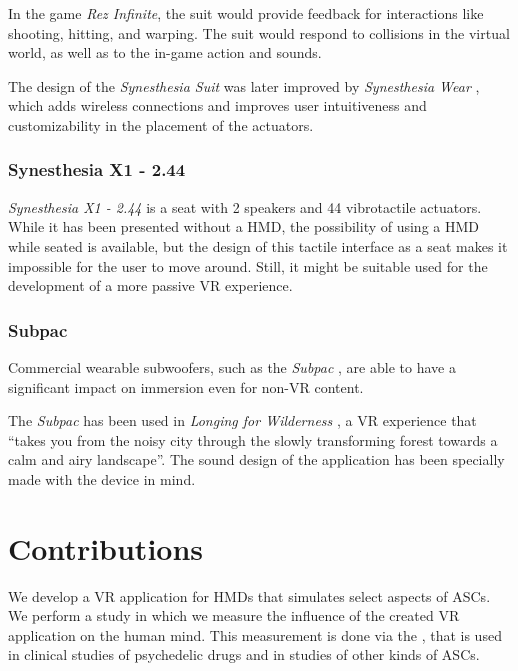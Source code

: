 In the game \textit{Rez Infinite}, the suit would provide feedback for interactions like shooting, hitting, and warping. The suit would respond to collisions in the virtual world, as well as to the in-game action and sounds.

The design of the \textit{Synesthesia Suit} was later improved by \textit{Synesthesia Wear} \autocite{furukawa2019synesthesia}, which adds wireless connections and improves user intuitiveness and customizability in the placement of the actuators.

\subsubsection{Synesthesia X1 - 2.44}
\textit{Synesthesia X1 - 2.44} \autocite{synesthesia2021x1} is a seat with 2 speakers and 44 vibrotactile actuators. While it has been presented without a \ac{HMD}, the possibility of using a \ac{HMD} while seated is available, but the design of this tactile interface as a seat makes it impossible for the user to move around. Still, it might be suitable used for the development of a more passive \ac{VR} experience.

\subsubsection{Subpac}
Commercial wearable subwoofers, such as the \textit{Subpac} \autocite{subpac2013subpac}, are able to have a significant impact on immersion \autocite{drempetic2017wearable} even for non-\ac{VR} content.

The \textit{Subpac} has been used in \textit{Longing for Wilderness} \autocite{zimmermann2016longing}, a \ac{VR} experience that ``takes you from the noisy city through the slowly transforming forest towards a calm and airy landscape''. The sound design of the application has been specially made with the device in mind.

\section{Contributions}
We develop a \ac{VR} application for \acp{HMD} that simulates select aspects of \acp{ASC}.
We perform a study in which we measure the influence of the created \ac{VR} application on the human mind. This measurement is done via the , that is used in clinical studies of psychedelic drugs and in studies of other kinds of \acp{ASC}.
